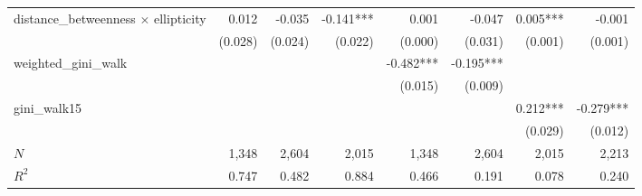 \begin{tabular}{lrrrrrrr}
distance\_betweenness $\times$ ellipticity &                        0.012 &                     -0.035 &                    -0.141*** &                            0.001 &                         -0.047 &                                                          0.005*** &                                              -0.001 \\ 
                                           &                      (0.028) &                    (0.024) &                      (0.022) &                          (0.000) &                        (0.031) &                                                           (0.001) &                                             (0.001) \\ 
weighted\_gini\_walk                       &                              &                            &                              &                        -0.482*** &                      -0.195*** &                                                                   &                                                     \\ 
                                           &                              &                            &                              &                          (0.015) &                        (0.009) &                                                                   &                                                     \\ 
gini\_walk15                               &                              &                            &                              &                                  &                                &                                                          0.212*** &                                           -0.279*** \\ 
                                           &                              &                            &                              &                                  &                                &                                                           (0.029) &                                             (0.012) \\ 
\midrule
$N$                                        &                        1,348 &                      2,604 &                        2,015 &                            1,348 &                          2,604 &                                                             2,015 &                                               2,213 \\ 
$R^2$                                      &                        0.747 &                      0.482 &                        0.884 &                            0.466 &                          0.191 &                                                             0.078 &                                               0.240 \\ 
\bottomrule
\end{tabular}
